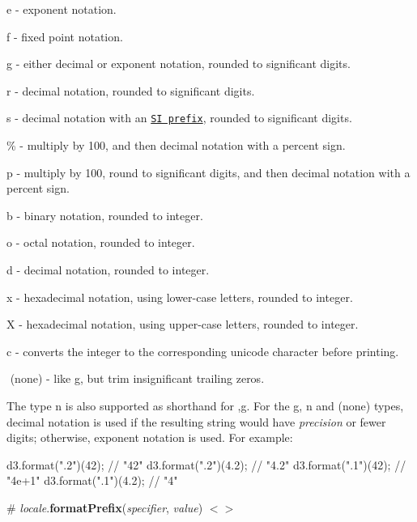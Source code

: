 \begin{DoxyItemize}
\item {\ttfamily e} -\/ exponent notation.
\item {\ttfamily f} -\/ fixed point notation.
\item {\ttfamily g} -\/ either decimal or exponent notation, rounded to significant digits.
\item {\ttfamily r} -\/ decimal notation, rounded to significant digits.
\item {\ttfamily s} -\/ decimal notation with an \href{#locale_formatPrefix}{\tt SI prefix}, rounded to significant digits.
\item {\ttfamily \%} -\/ multiply by 100, and then decimal notation with a percent sign.
\item {\ttfamily p} -\/ multiply by 100, round to significant digits, and then decimal notation with a percent sign.
\item {\ttfamily b} -\/ binary notation, rounded to integer.
\item {\ttfamily o} -\/ octal notation, rounded to integer.
\item {\ttfamily d} -\/ decimal notation, rounded to integer.
\item {\ttfamily x} -\/ hexadecimal notation, using lower-\/case letters, rounded to integer.
\item {\ttfamily X} -\/ hexadecimal notation, using upper-\/case letters, rounded to integer.
\item {\ttfamily c} -\/ converts the integer to the corresponding unicode character before printing.
\item {\ttfamily ​} (none) -\/ like {\ttfamily g}, but trim insignificant trailing zeros.
\end{DoxyItemize}

The type {\ttfamily n} is also supported as shorthand for {\ttfamily ,g}. For the {\ttfamily g}, {\ttfamily n} and {\ttfamily ​} (none) types, decimal notation is used if the resulting string would have {\itshape precision} or fewer digits; otherwise, exponent notation is used. For example\+:


\begin{DoxyCode}
d3.format(".2")(42);  // "42"
d3.format(".2")(4.2); // "4.2"
d3.format(".1")(42);  // "4e+1"
d3.format(".1")(4.2); // "4"
\end{DoxyCode}


\label{_locale_formatPrefix}%
\# {\itshape locale}.{\bfseries format\+Prefix}({\itshape specifier}, {\itshape value}) \href{https://github.com/d3/d3-format/blob/master/src/locale.js#L127}{\tt $<$$>$}

